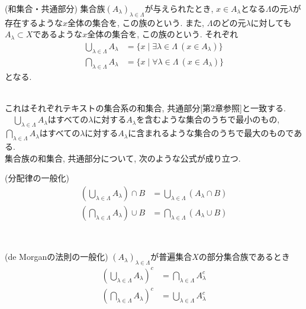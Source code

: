 \documentclass[a4j]{jsarticle}
\begin{document}
\begin{itembox}[l]{ (和集合・共通部分)}
  集合族$(A_\lambda)_{\lambda \in \Lambda}$が与えられたとき, $x \in A_\lambda$となる$\Lambda$の元$\lambda$が存在するような$x$全体の集合を, この族のという. また, $\Lambda$のどの元$\lambda$に対しても$A_\lambda \subset X$であるような$x$全体の集合を, この族のという. それぞれ
  \begin{align}
    \bigcup_{\lambda \in \Lambda}A_\lambda & = \{ x \mid \exists\lambda \in \Lambda\:(x \in A_\lambda) \} \\
    \bigcap_{\lambda \in \Lambda}A_\lambda & = \{ x \mid \forall\lambda \in \Lambda\:(x \in A_\lambda) \}
  \end{align}
  となる.
\end{itembox}\\

これはそれぞれテキスト\cite{text}の集合系の和集合, 共通部分[第2章参照]と一致する. \\


　$\bigcup_{\lambda \in \Lambda}A_\lambda$はすべての$\lambda$に対する$A_\lambda$を含むような集合のうちで最小のもの, $\bigcap_{\lambda \in \Lambda}A_\lambda$はすべての$\lambda$に対する$A_\lambda$に含まれるような集合のうちで最大のものである. \\

集合族の和集合, 共通部分について, 次のような公式が成り立つ. \\

\begin{itembox}[l]{ (分配律の一般化)}
  \begin{align}
    \left( \bigcup_{\lambda \in \Lambda}A_\lambda \right) \cap B & = \bigcup_{\lambda \in \Lambda}(A_\lambda \cap B) \\
    \left( \bigcap_{\lambda \in \Lambda}A_\lambda \right) \cup B & = \bigcap_{\lambda \in \Lambda}(A_\lambda \cup B)
  \end{align}
\end{itembox}\\

\begin{itembox}[l]{ (de Morganの法則の一般化)}
  $(A_\lambda)_{\lambda \in \Lambda}$が普遍集合$X$の部分集合族であるとき
  \begin{align}
    \left( \bigcup_{\lambda \in \Lambda}A_\lambda \right)^c & = \bigcap_{\lambda \in \Lambda}A_\lambda^c \\
    \left( \bigcap_{\lambda \in \Lambda}A_\lambda \right)^c & = \bigcup_{\lambda \in \Lambda}A_\lambda^c
  \end{align}
\end{itembox}\\
\end{document}
